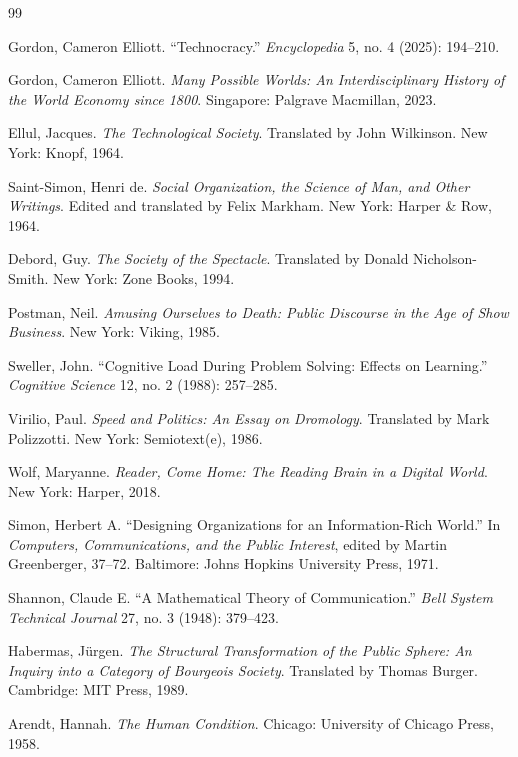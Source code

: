 \documentclass[12pt]{article}
\begin{document}
\newpage
\begin{thebibliography}{99}

Gordon, Cameron Elliott.
``Technocracy.''
\textit{Encyclopedia} 5, no. 4 (2025): 194--210.

Gordon, Cameron Elliott.
\textit{Many Possible Worlds: An Interdisciplinary History of the World Economy since 1800}.
Singapore: Palgrave Macmillan, 2023.

Ellul, Jacques.
\textit{The Technological Society}.
Translated by John Wilkinson.
New York: Knopf, 1964.

Saint-Simon, Henri de.
\textit{Social Organization, the Science of Man, and Other Writings}.
Edited and translated by Felix Markham.
New York: Harper \& Row, 1964.

Debord, Guy.
\textit{The Society of the Spectacle}.
Translated by Donald Nicholson-Smith.
New York: Zone Books, 1994.

Postman, Neil.
\textit{Amusing Ourselves to Death: Public Discourse in the Age of Show Business}.
New York: Viking, 1985.

Sweller, John.
``Cognitive Load During Problem Solving: Effects on Learning.''
\textit{Cognitive Science} 12, no. 2 (1988): 257--285.

Virilio, Paul.
\textit{Speed and Politics: An Essay on Dromology}.
Translated by Mark Polizzotti.
New York: Semiotext(e), 1986.

Wolf, Maryanne.
\textit{Reader, Come Home: The Reading Brain in a Digital World}.
New York: Harper, 2018.

Simon, Herbert A.
``Designing Organizations for an Information-Rich World.''
In \textit{Computers, Communications, and the Public Interest}, edited by Martin Greenberger, 37--72.
Baltimore: Johns Hopkins University Press, 1971.

Shannon, Claude E.
``A Mathematical Theory of Communication.''
\textit{Bell System Technical Journal} 27, no. 3 (1948): 379--423.

Habermas, J\"{u}rgen.
\textit{The Structural Transformation of the Public Sphere: An Inquiry into a Category of Bourgeois Society}.
Translated by Thomas Burger.
Cambridge: MIT Press, 1989.

Arendt, Hannah.
\textit{The Human Condition}.
Chicago: University of Chicago Press, 1958.


\end{thebibliography}
\end{document}
